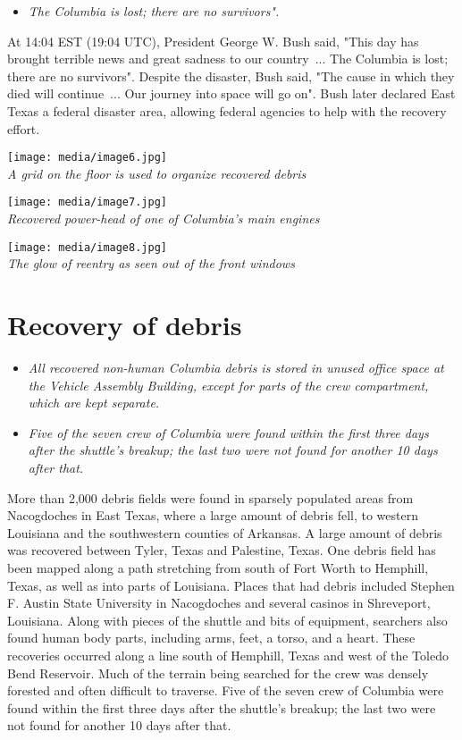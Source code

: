 \begin{itemize}
\item
  \emph{The Columbia is lost; there are no survivors".}
\end{itemize}

At 14:04 EST (19:04 UTC), President George W. Bush said, "This day has
brought terrible news and great sadness to our country~... The Columbia
is lost; there are no survivors". Despite the disaster, Bush said, "The
cause in which they died will continue~... Our journey into space will
go on". Bush later declared East Texas a federal disaster area, allowing
federal agencies to help with the recovery effort.

\texttt{[image: media/image6.jpg]}\\
\emph{A grid on the floor is used to organize recovered debris}

\texttt{[image: media/image7.jpg]}\\
\emph{Recovered power-head of one of Columbia's main engines}

\texttt{[image: media/image8.jpg]}\\
\emph{The glow of reentry as seen out of the front windows}

\section{Recovery of debris}\label{recovery-of-debris}

\begin{itemize}
\item
  \emph{All recovered non-human Columbia debris is stored in unused
  office space at the Vehicle Assembly Building, except for parts of the
  crew compartment, which are kept separate.}
\item
  \emph{Five of the seven crew of Columbia were found within the first
  three days after the shuttle's breakup; the last two were not found
  for another 10 days after that.}
\end{itemize}

More than 2,000 debris fields were found in sparsely populated areas
from Nacogdoches in East Texas, where a large amount of debris fell, to
western Louisiana and the southwestern counties of Arkansas. A large
amount of debris was recovered between Tyler, Texas and Palestine,
Texas. One debris field has been mapped along a path stretching from
south of Fort Worth to Hemphill, Texas, as well as into parts of
Louisiana. Places that had debris included Stephen F. Austin State
University in Nacogdoches and several casinos in Shreveport, Louisiana.
Along with pieces of the shuttle and bits of equipment, searchers also
found human body parts, including arms, feet, a torso, and a heart.
These recoveries occurred along a line south of Hemphill, Texas and west
of the Toledo Bend Reservoir. Much of the terrain being searched for the
crew was densely forested and often difficult to traverse. Five of the
seven crew of Columbia were found within the first three days after the
shuttle's breakup; the last two were not found for another 10 days after
that.

